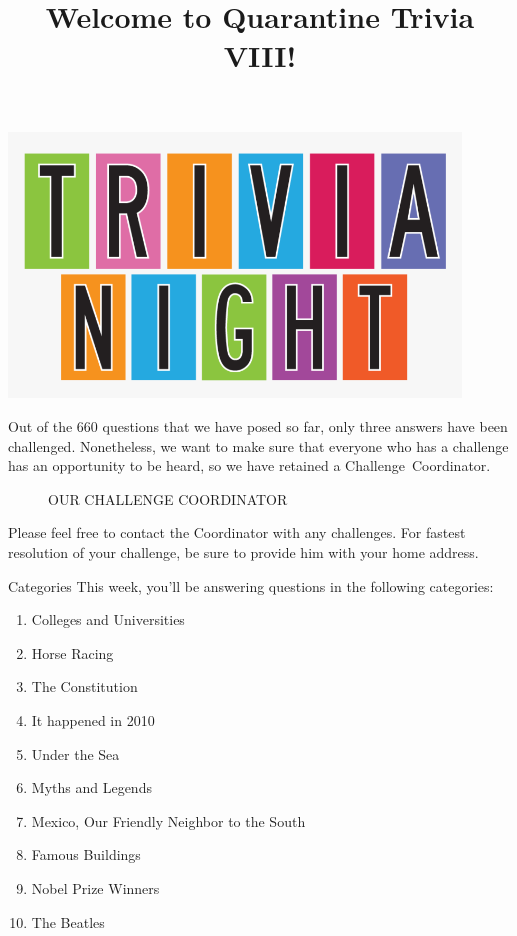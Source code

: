\documentclass[11pt,draft]{beamer}
\begin{document}
\title{Welcome to Quarantine Trivia VIII!\vspace{-0.5in}}
\date{}

\begin{frame}
    \titlepage{}
    \begin{center}
        \includegraphics[max width=0.9\textwidth,
            max height=0.4\textheight]{Images/triviatitleframelogo.png}
    \end{center}
\end{frame}

\begingroup{}
\begin{frame}[t]{}
    Out of the 660 questions that we have posed so far, only three answers have been
    challenged. Nonetheless, we want to make sure that everyone who has a challenge has an
    opportunity to be heard, so we have retained a \mbox{Challenge Coordinator}.


    \begin{center}
        \begin{figure}[h]
            \caption*{OUR CHALLENGE COORDINATOR}
        \end{figure}
    \end{center}
    Please feel free to contact the Coordinator with any challenges.
    For fastest resolution of your challenge, be sure to provide him with your home address.
\end{frame}
\endgroup{}

\begingroup{}
\begin{frame}[t]{Categories}
    This week, you'll be answering questions in the following categories:
    \begin{enumerate}
        \item Colleges and Universities
        \item Horse Racing
        \item The Constitution
        \item It happened in 2010
        \item Under the Sea
        \item Myths and Legends
        \item Mexico, Our Friendly Neighbor to the South
        \item Famous Buildings
        \item Nobel Prize Winners
        \item The Beatles
    \end{enumerate}
\end{frame}
\endgroup{}
\end{document}
